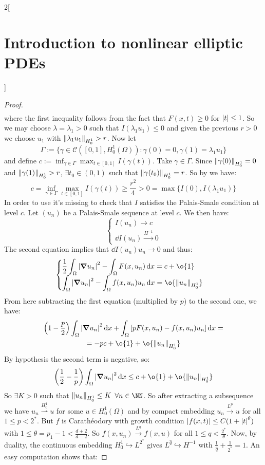 \documentclass[../../../main_math.tex]{subfiles}
\begin{document}
\begin{multicols}{2}[\section{Introduction to nonlinear elliptic PDEs}]
\begin{proof}
\begin{multline*}
    \end{multline*}
    where the first inequality follows from the fact that $F(x,t)\geq 0$ for $\abs{t}\leq 1$. So we may choose $\lambda=\lambda_1>0$ such that $I(\lambda_1 u_1)\leq 0$ and given the previous $r>0$ we choose $u_1$ with $\norm{\lambda_1 u_1}_{H_0^1}>r$. Now let
    $$
      \Gamma:=\{\gamma\in \mathcal{C}([0,1],H_0^1(\Omega)):\gamma(0)=0,\gamma(1)=\lambda_1 u_1\}
    $$
    and define $c:=\displaystyle \inf_{\gamma\in \Gamma}\max_{t\in [0,1]}I(\gamma(t))$. Take $\gamma\in \Gamma$. Since $\norm{\gamma(0)}_{H_0^1}=0$ and $\norm{\gamma(1)}_{H_0^1}> r$, $\exists t_0\in (0,1)$ such that $\norm{\gamma(t_0)}_{H_0^1}=r$. So by  we have:
    $$
      c =\displaystyle \inf_{\gamma\in \Gamma}\max_{t\in [0,1]}I(\gamma(t))\geq \frac{r^2}{4}>0=\max\{I(0),I(\lambda_1 u_1)\}
    $$
    In order to use  it's missing to check that $I$ satisfies the Palais-Smale condition at level $c$. Let $(u_n)$ be a Palais-Smale sequence at level $c$. We then have:
    $$
      \begin{cases}
        I(u_n)\to c \\
        \dd{I(u_n)}\overset{H^{-1}}{\longrightarrow} 0
      \end{cases}$$
    The second equation implies that $\dd{I(u_n)}u_n\to 0$ and thus:
    $$
      \begin{cases}
        \displaystyle\frac{1}{2}\int_\Omega \abs{\grad u_n}^2-\int_\Omega F(x,u_n)\dd{x}=c+\o{1} \\
        \displaystyle\int_\Omega \abs{\grad u_n}^2-\int_\Omega f(x,u_n)u_n\dd{x}=\o{\norm{u_n}_{H_0^1}}
      \end{cases}
    $$
    From here subtracting the first equation (multiplied by $p$) to the second one, we have:
    \begin{multline*}
      \left(1-\frac{p}{2}\right)\int_\Omega \abs{\grad u_n}^2\dd{x}+\int_\Omega \left[pF(x,u_n)-f(x,u_n)u_n\right]\dd{x}=\\
      =-pc+\o{1} + \o{\norm{u_n}_{H_0^1}}
    \end{multline*}
    By hypothesis the second term is negative, so:
    $$
      \left(\frac{1}{2}- \frac{1}{p}\right)\int_\Omega \abs{\grad u_n}^2\dd{x}\leq c + \o{1} + \o{\norm{u_n}_{H_0^1}}
    $$
    So $\exists K>0$ such that $\norm{u_n}_{H_0^1}\leq K$ $\forall n\in\NN$. So after extracting a subsequence we have $u_n\overset{H_0^1}{\rightharpoonup} u$ for some $u\in H_0^1(\Omega)$ and by compact embedding $u_n\overset{L^p}{\longrightarrow} u$ for all $1\leq p<2^*$. But $f$ is Carathéodory with growth condition $\abs{f(x,t)}\leq C(1+\abs{t}^{\theta})$ with $1\leq \theta =p_1-1<\frac{d+2}{d-2}$. So $f(x,u_n)\overset{L^q}{\longrightarrow} f(x,u)$ for all $1\leq q<\frac{2^*}{\theta}$. Now, by duality, the continuous embedding $H_0^1\hookrightarrow L^{2^*}$ gives $L^{\hat{q}} \hookrightarrow H^{-1}$ with $\frac{1}{\hat{q}}+\frac{1}{2^*}=1$. An easy computation shows that:

\end{proof}
\end{multicols}
\end{document}
